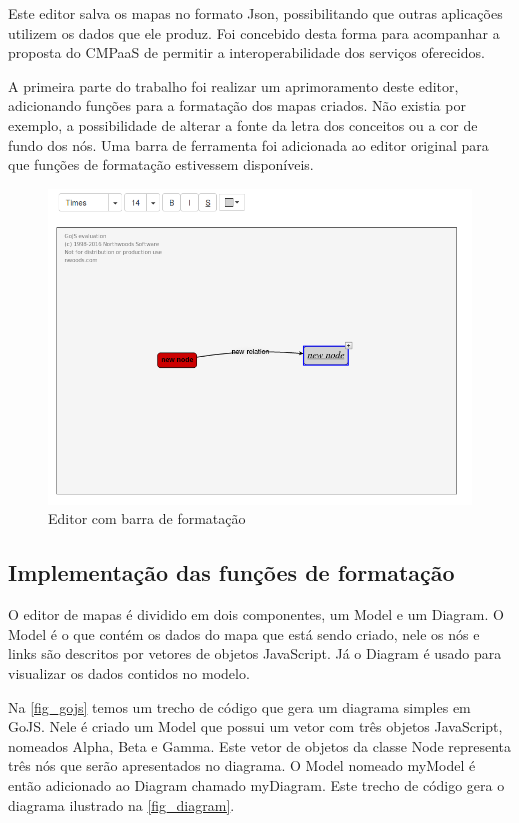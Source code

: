 \documentclass[
	12pt,				%
	openright,			%
	oneside,			%
	a4paper,			%
	english,			%
	french,				%
	spanish,			%
	brazil				%
	]{abntex2}
\begin{document}
Este editor salva os mapas no formato Json, possibilitando que outras aplicações utilizem os dados que ele produz. Foi concebido desta forma para acompanhar a proposta do CMPaaS de permitir a interoperabilidade dos serviços oferecidos.

A primeira parte do trabalho foi realizar um aprimoramento deste editor, adicionando funções para a formatação dos mapas criados. Não existia por exemplo, a possibilidade de alterar a fonte da letra dos conceitos ou a cor de fundo dos nós. Uma barra de ferramenta foi adicionada ao editor original para que funções de formatação estivessem disponíveis.

\begin{figure}[htb]
	\caption{\label{fig_barraformacao} Editor com barra de formatação}
	\begin{center}
		\includegraphics[scale=0.5]{barraformacao.png}
	\end{center}
\end{figure}

\subsection{Implementação das funções de formatação}
O editor de mapas é dividido em dois componentes, um Model e um Diagram. O Model é o que contém os dados do mapa que está sendo criado, nele os nós e links são descritos por vetores de objetos JavaScript. Já o Diagram é usado para visualizar os dados contidos no modelo.

Na \autoref{fig_gojs} temos um trecho de código que gera um diagrama simples em GoJS. Nele é criado um Model que possui um vetor com três objetos JavaScript, nomeados Alpha, Beta e Gamma. Este vetor de objetos da classe Node representa três nós que serão apresentados no diagrama. O Model nomeado myModel é então adicionado ao Diagram chamado myDiagram. Este trecho de código gera o diagrama ilustrado na \autoref{fig_diagram}.
\end{document}
